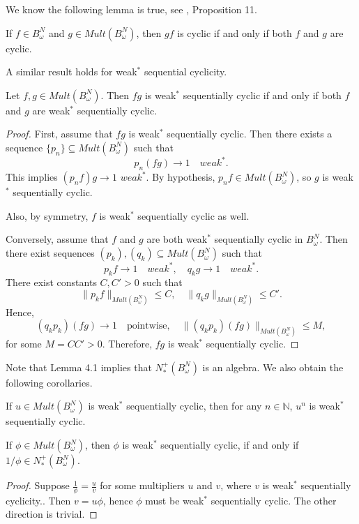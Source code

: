 \documentclass{article}
\numberwithin{equation}{section}
\begin{document}
We know the following lemma is true, see \cite{BrownShields1984}, Proposition 11.
\begin{lem}\label{lem:cyclicProducts}
    If $f \in B^{N}_{\omega}$ and $g \in Mult(B^{N}_{\omega})$, then $gf$ is cyclic if and only if both $f$ and $g$ are cyclic.
\end{lem}


A similar  result holds for  weak$^\ast$ sequential cyclicity.


\begin{lem}
Let $f, g \in Mult(B^{N}_{\omega})$. Then $fg$ is weak$^\ast$ sequentially cyclic if and only if both $f$ and $g$ are weak$^\ast$ sequentially cyclic.
\end{lem}

\begin{proof}
First, assume that $fg$ is weak$^\ast$ sequentially cyclic. Then there exists a sequence $\{p_n\} \subseteq  Mult(B^{N}_{\omega})$ such that
\[
p_n (fg) \to 1 \quad \text{$weak^\ast$}.
\]
This implies $(p_n f) g \to 1$ $weak^\ast$. By hypothesis, $p_n f \in Mult(B^{N}_{\omega})$, so $g$ is weak$^\ast$ sequentially cyclic.  

Also, by symmetry, $f $ is weak$^\ast$ sequentially cyclic as well.  

Conversely, assume that $f$ and $g$ are both weak$^\ast$ sequentially cyclic in $B^{N}_{\omega}$. Then there exist sequences $(p_k), (q_k) \subseteq  Mult(B^{N}_{\omega})$ such that
\[
p_k f \to 1 \quad \text{$weak^\ast$}, \quad q_k g \to 1 \quad \text{$weak^\ast$}.
\]
There exist constants $C, C' > 0$ such that
\[
\|p_k f\|_{Mult(B^{N}_{\omega})} \leq C, \quad \|q_k g\|_{Mult(B^{N}_{\omega})} \leq C'.
\]
Hence,
\[
(q_k p_k) (fg) \to 1 \quad \text{pointwise}, \quad \|(q_k p_k) (fg)\|_{Mult(B^{N}_{\omega})} \leq M,
\]
for some $M = CC' > 0$. Therefore, $fg$ is weak$^\ast$ sequentially cyclic.
\end{proof}

Note that Lemma 4.1 implies that $N^{+}_{*} (B^{N}_{\omega})$ is an algebra. We also obtain the following corollaries.

\begin{cor}\label{cor:u^n}
If $u \in Mult(B^{N}_{\omega})$ is weak$^\ast$ sequentially cyclic, then for any $n \in \mathbb{N}$, $u^n$ is weak$^\ast$ sequentially cyclic.
\end{cor}
\begin{cor}
If $\phi \in Mult(B^{N}_{\omega})$, then  $\phi$ is weak$^\ast$ sequentially cyclic, if and only if $1/\phi\in N^+_\ast(B^N_\omega)$.
\end{cor}
\begin{proof} Suppose $\frac{1}{\phi}=\frac{u}{v}$ for some multipliers $u$ and $v$, where $v$ is weak$^\ast$ sequentially cyclicity.. Then $v=u\phi$, hence $\phi$ must be weak$^\ast$ sequentially cyclic. The other direction is trivial.\end{proof}
\end{document}
